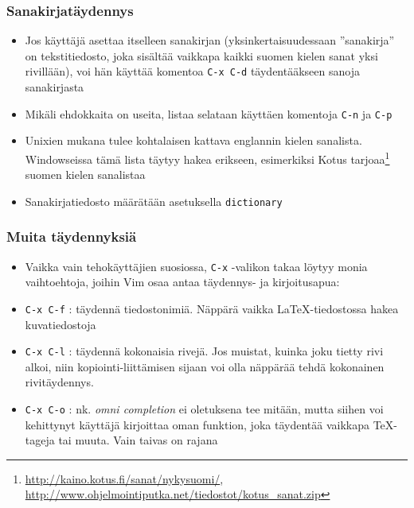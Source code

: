 \documentclass[]{beamer}
\newcommand{\Tohj}[1]{\texttt{#1}}
\newcommand{\com}[1]{{\color{blue!50!black}\Tohj{#1}} \!\!}
\newcommand{\set}[1]{\texttt{#1}}
\begin{document}
\begin{frame}
    \frametitle{Sanakirjatäydennys}
    \begin{itemize}
        \item Jos käyttäjä asettaa itselleen sanakirjan (yksinkertaisuudessaan ''sanakirja'' on tekstitiedosto, joka sisältää vaikkapa kaikki suomen kielen sanat yksi rivillään), voi hän käyttää komentoa \com{C-x C-d} täydentääkseen sanoja sanakirjasta
        \item Mikäli ehdokkaita on useita, listaa selataan käyttäen komentoja \com{C-n} ja \com{C-p}
        \item Unixien mukana tulee kohtalaisen kattava englannin kielen sanalista. Windowseissa tämä lista täytyy hakea erikseen, esimerkiksi Kotus tarjoaa\footnote{\url{http://kaino.kotus.fi/sanat/nykysuomi/}, \url{http://www.ohjelmointiputka.net/tiedostot/kotus_sanat.zip}} suomen kielen sanalistaa
        \item Sanakirjatiedosto määrätään asetuksella \set{dictionary}
    \end{itemize}
\end{frame}

\begin{frame}
    \frametitle{Muita täydennyksiä}
    \begin{itemize}
        \item Vaikka vain tehokäyttäjien suosiossa, \com{C-x} -valikon takaa löytyy monia vaihtoehtoja, joihin Vim osaa antaa täydennys- ja kirjoitusapua:
        \pause
        \item \com{C-x C-f}: täydennä tiedostonimiä. Näppärä vaikka \LaTeX -tiedostossa hakea kuvatiedostoja
        \pause
        \item \com{C-x C-l}: täydennä kokonaisia rivejä. Jos muistat, kuinka joku tietty rivi alkoi, niin kopiointi-liittämisen sijaan voi olla näppärää tehdä kokonainen rivitäydennys.
        \pause
        \item \com{C-x C-o}: nk. \emph{omni completion} ei oletuksena tee mitään, mutta siihen voi kehittynyt käyttäjä kirjoittaa oman funktion, joka täydentää vaikkapa \TeX -tageja tai muuta. Vain taivas on rajana
    \end{itemize}
\end{frame}
\end{document}
